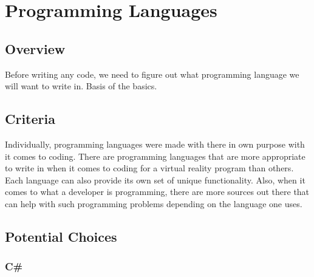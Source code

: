 \documentclass[letterpaper,10pt,onecolumn,compsoc]{IEEEtran}
\begin{document}
\newpage

\section{Programming Languages}
\subsection{Overview}

\noindent
Before writing any code, we need to figure out what programming language we will want to write in. Basis of the basics.

\subsection{Criteria}


\noindent
Individually, programming languages were made with there in own purpose with it comes to coding. There are programming languages that are more appropriate to write in when it comes to coding for a virtual reality program than others. Each language can also provide its own set of unique functionality. Also, when it comes to what a developer is programming, there are more sources out there that can help with such programming problems depending on the language one uses.

\subsection{Potential Choices}
\subsubsection{C\#}
\end{document}
